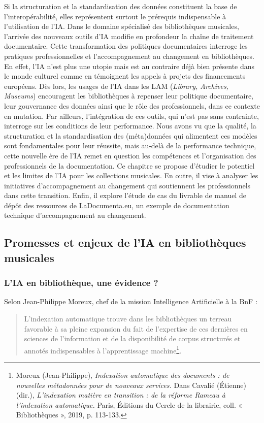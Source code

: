 Si la structuration et la standardisation des données constituent la base de l'interopérabilité, elles représentent surtout le prérequis indispensable à l'utilisation de l'IA. 
Dans le domaine spécialisé des bibliothèques musicales, l'arrivée des nouveaux outils d'IA modifie en profondeur la chaîne de traitement documentaire. Cette transformation des politiques documentaires interroge les pratiques professionnelles et l'accompagnement au changement en bibliothèques. 
En effet, l'IA n'est plus une utopie mais est au contraire déjà bien présente dans le monde culturel comme en témoignent les appels à projets des financements européens. Dès lors, les usages de l'IA dans les LAM (\textit{Library, Archives, Museums}) encouragent les bibliothèques à repenser leur politique documentaire, leur gouvernance des données ainsi que le rôle des professionnels, dans ce contexte en mutation. 
Par ailleurs, l'intégration de ces outils, qui n'est pas sans contrainte, interroge sur les conditions de leur performance. Nous avons vu que la qualité, la structuration et la standardisation des (méta)données qui alimentent ces modèles sont fondamentales pour leur réussite, mais au-delà de la performance technique, cette nouvelle ère de l'IA remet en question les compétences et l'organisation des professionnels de la documentation.
Ce chapitre se propose d'étudier le potentiel et les limites de l'IA pour les collections musicales.
En outre, il vise à analyser les initiatives d'accompagnement au changement qui soutiennent les professionnels dans cette transition. Enfin, il explore l'étude de cas du livrable de manuel de dépôt des ressources de LaDocumenta.eu, un exemple de documentation technique d'accompagnement au changement. 


\subsection*{Promesses et enjeux de l'IA en bibliothèques musicales}


\subsubsection*{L'IA en bibliothèque, une évidence ?}

Selon Jean-Philippe Moreux, chef de la mission Intelligence Artificielle à la BnF :
\begin{quotation}
	L'indexation automatique trouve dans les bibliothèques un terreau favorable à sa pleine expansion du fait de l'expertise de ces dernières en sciences de l'information et de la disponibilité de corpus structurés et annotés indispensables à l'apprentissage machine\footnote{Moreux (Jean-Philippe), \textit{Indexation automatique des documents : de nouvelles métadonnées pour de nouveaux services.} Dans Cavalié (Étienne) (dir.), \textit{L'indexation matière en transition : de la réforme Rameau à l'indexation automatique.} Paris, Éditions du Cercle de la librairie, coll. « Bibliothèques », 2019, p. 113-133.}.
\end{quotation}

